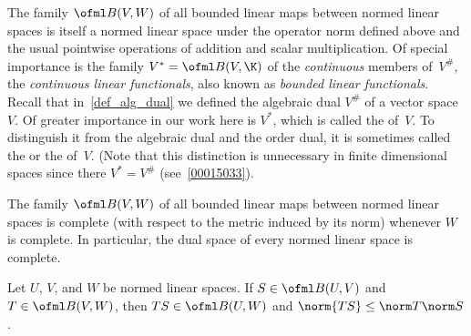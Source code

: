\begin{exam}\label{C023228} The family $\ofml B(V,W)$ of all bounded linear maps
between normed linear spaces is itself a normed linear space under the operator norm defined above and the usual
pointwise operations of addition and scalar multiplication.  Of special importance is the family $V^* = \ofml B(V,\K)$
of the \emph{continuous} members of~$V^{\#}$, the
\emph{continuous linear functionals}, also known as
\emph{bounded linear functionals}.
Recall that in~\ref{def_alg_dual} we defined the algebraic dual $V^{\#}$ of a vector space~$V$. Of
greater importance in our work here is $V^*$, which is called the
 of~$V$.  To distinguish it from the algebraic dual and the order dual, it is sometimes called the
 or the
 of~$V$.  (Note that this distinction is unnecessary in finite dimensional spaces
since there $V^* = V^{\#}$ (see~\ref{00015033}).
\end{exam}

\begin{prop}\label{C023228a} The family $\ofml B(V,W)$ of all bounded linear maps
between normed linear spaces is complete (with respect to the metric induced by its norm)
whenever $W$ is complete.  In particular, the dual space of every normed linear space is complete.
\end{prop}

















\begin{prop}\label{0003073} Let $U$, $V$, and $W$ be normed linear spaces.  If $S \in
\ofml B(U,V)$ and $T \in \ofml B(V,W)$, then $TS \in \ofml B(U,W)$ and $\norm{TS} \le
\norm T \norm S$.
\end{prop}

